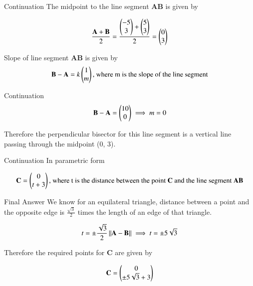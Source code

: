 \documentclass{beamer}
\begin{document}
\begin{frame}{Continuation}
    The midpoint to the line segment \textbf{AB} is given by

\begin{align}
        \frac{\textbf{A}+\textbf{B}}{2} = \frac{\begin{pmatrix}-5\\3\end{pmatrix}+\begin{pmatrix}5\\3\end{pmatrix}}{2} = \begin{pmatrix}0\\3\end{pmatrix}
        \label{0.5}
\end{align}

Slope of line segment \textbf{AB} is given by
\begin{align}
    \textbf{B}-\textbf{A}=k\begin{pmatrix}1\\m\end{pmatrix}\text{, where m is the slope of the line segment}
    \label{0.6}
\end{align}
\end{frame}

\begin{frame}{Continuation}
    \begin{align}
    \textbf{B}-\textbf{A}=\begin{pmatrix}10\\0\end{pmatrix} \implies m=0
    \label{0.7}
\end{align}

Therefore the perpendicular bisector for this line segment is a vertical line passing through the midpoint (0, 3).\\
\end{frame}

\begin{frame}{Continuation}
    In parametric form

\begin{align}
    \textbf{}
    \textbf{C}= \begin{pmatrix}0\\t+3\end{pmatrix}\text{, where t is the distance between the point \textbf{C} and the line segment \textbf{AB}}
    \label{0.8}
\end{align}
\end{frame}

\begin{frame}{Final Answer}
    We know for an equilateral triangle, distance between a point and the opposite edge is $\frac{\sqrt{3}}{2}$ times the length of an edge of that triangle.

\begin{align}
    t=\pm \frac{\sqrt{3}}{2}\left\lVert\textbf{A}-\textbf{B}\right\rVert \implies t=\pm 5\sqrt{3}
    \label{0.9}
\end{align}

Therefore the required points for \textbf{C} are given by

\begin{align}
    \textbf{C} = \begin{pmatrix}0\\\pm 5\sqrt{3}+3\end{pmatrix}
    \label{0.9}
\end{align}
\end{frame}
\end{document}
